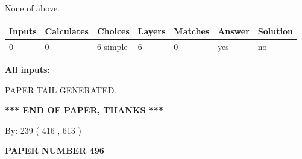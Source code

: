 \documentclass[12pt]{article}
\begin{document}
 
 None of above.
 
 
\noindent{}
 
 
   
   
   
   
\noindent\begin{tabular}{|l|l|l|l|l|l|l|}
 \hline
Inputs & Calculates & Choices & Layers & Matches & Answer & Solution \\ \hline
 0  & 
 0  & 
 6
  simple  
  & 
 6  & 
 0  & 
  yes & 
  no 
  \\ \hline
 \end{tabular}
   
   
   
   
\noindent{}
   
   
   
   
\noindent\vspace{0.1in}\hspace{-0.08in} {\textbf{\Large{All inputs: }}}
   
   
   
   
   
   
 \vspace{0.2in}
 
   
   
\vspace{2.0in} PAPER TAIL GENERATED.
   
   
   
   
\vspace{1.0in} 
{\textbf{\large{ *** END OF PAPER, THANKS *** }}} 
   
   
\hspace{1.0in} By: 
 239 ( 416 ,  613 )
   
   
   
   
\newpage 
\setcounter{page}{ 
   496001 } 
   
   
   
   
 {\textbf{ \Large{ PAPER NUMBER  496  }}}
   
   
\vspace{0.2in}
   
   
   
   
   
   
   
\end{document}
